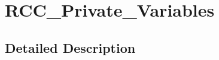 \hypertarget{group___r_c_c___private___variables}{\section{R\-C\-C\-\_\-\-Private\-\_\-\-Variables}
\label{group___r_c_c___private___variables}
}


\subsection{Detailed Description}
